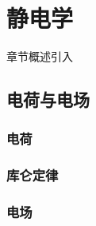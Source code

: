 \chapter{静电学}\label{15}

章节概述引入

\section{电荷与电场}\label{15-1}

\subsection{电荷}\label{15-1-1}

\subsection{库仑定律}\label{15-1-2}

\subsection{电场}\label{15-1-3}